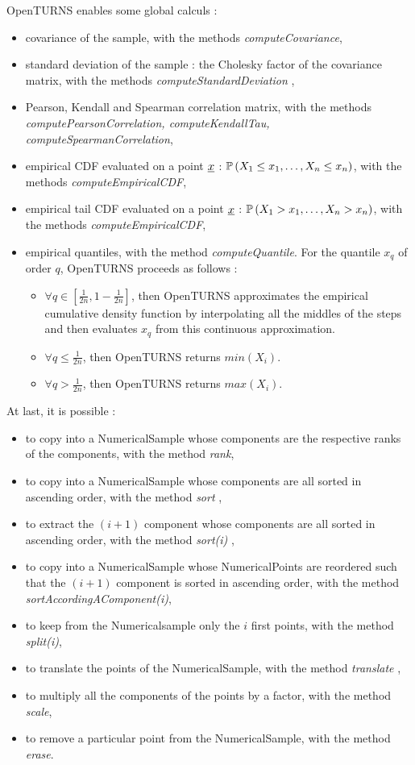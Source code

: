 OpenTURNS enables some global calculs :
\begin{itemize}
\item covariance of the sample, with the methods {\itshape computeCovariance},
\item standard deviation of the sample : the Cholesky factor of the covariance matrix, with the methods {\itshape computeStandardDeviation },
\item Pearson, Kendall and Spearman correlation matrix, with the methods {\itshape computePearsonCorrelation, computeKendallTau, computeSpearmanCorrelation},
\item empirical CDF evaluated on a point ${\underline{x}}$ : ${\mathbb P}\left( X_1 \leq x_1, \hdots, X_n \leq x_n \right)$, with the methods {\itshape computeEmpiricalCDF},
\item empirical tail CDF evaluated on a point ${\underline{x}}$ : ${\mathbb P}\left( X_1 > x_1, \hdots, X_n > x_n \right)$, with the methods {\itshape computeEmpiricalCDF},
\item empirical quantiles, with the method {\itshape computeQuantile}. For the quantile $x_q$ of order $q$, OpenTURNS proceeds as follows :
  \begin{itemize}
  \item $\forall q \in [\frac{1}{2n}, 1-\frac{1}{2n}]$, then OpenTURNS approximates the empirical  cumulative density function by interpolating all the middles of the steps and then evaluates  $x_q$ from this continuous approximation.
  \item $\forall q \leq \frac{1}{2n}$, then OpenTURNS returns $min(X_i)$.
  \item $\forall q > \frac{1}{2n}$, then OpenTURNS returns $max(X_i)$.
  \end{itemize}
\end{itemize}

At last, it is possible :
\begin{itemize}
\item to copy into a NumericalSample whose components are the respective ranks of the components, with the method {\itshape rank},
\item to copy into a NumericalSample whose components are all sorted in ascending order, with the method {\itshape sort },
\item to extract the $(i+1)$ component whose components are all sorted in ascending order, with the method {\itshape sort(i) },
\item to copy into a NumericalSample whose NumericalPoints are reordered such that the $(i+1)$ component is sorted in ascending order, with the method  {\itshape sortAccordingAComponent(i)},
\item to keep from the Numericalsample only the $i$ first points, with the method  {\itshape split(i)},
\item to translate the points of the NumericalSample, with the method  {\itshape translate },
\item to multiply all the components of the points by a factor, with the method  {\itshape  scale},
\item to remove a particular point from the NumericalSample, with the method  {\itshape  erase}.
\end{itemize}



